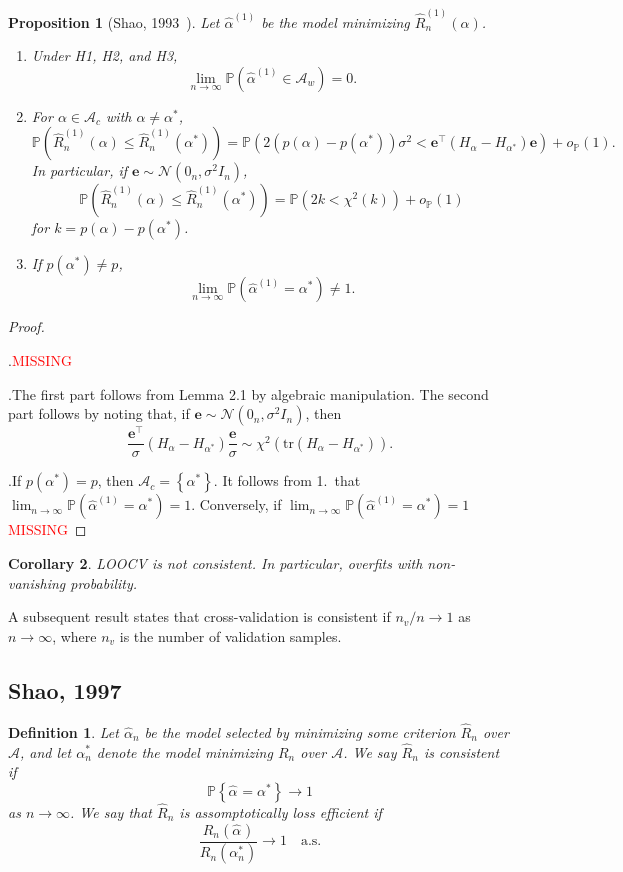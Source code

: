 \documentclass[12pt, letter paper]{article}
\newcommand{\1}{\mathmybb{1}}
\newtheorem{definition}{Definition}[section]
\newtheorem{proposition}{Proposition}[section]
\newtheorem{corollary}[proposition]{Corollary}
\newcommand{\0}{\emptyset}
\newcommand{\prob}{\mathbb{P}}
\newcommand{\paren}[1]{\left(#1 \right)}
\newcommand{\set}[1]{\left\{ #1 \right\}}
\newcommand{\Acal}{\mathcal{A}}
\newcommand{\Ncal}{\mathcal{N}}
\newcommand{\e}{\boldsymbol{e}}
\newcommand{\alphahat}[1]{\hat{\alpha}^{#1}}
\newcommand{\loocv}[1]{\hat{R}^{(1)}_{n}\paren{#1}}
\newcommand{\op}[1]{o_{\prob}\paren{#1}}
\begin{document}
\begin{proposition}[Shao, 1993~\cite{shao_1993}]
    Let \(\alphahat{(1)}\) be the model minimizing \(\loocv{\alpha}\).
    \begin{enumerate}
        \item Under H1, H2, and H3, \[\lim_{n\to\infty}\prob\paren{\alphahat{(1)}\in\Acal_{w}}=0.\]
        \item For \(\alpha\in\Acal_{c}\) with \(\alpha\neq\alpha^{*}\),\[\prob\paren{\loocv{\alpha}\leq \loocv{\alpha^{*}}} = \prob\paren{2\paren{p(\alpha) - p(\alpha^{*})}\sigma^{2} < \e^{\top}(H_{\alpha} - H_{\alpha^{*}})\e} + \op{1}.\] In particular, if \(\e\sim\Ncal(0_{n}, \sigma^{2}I_n)\), \[\prob\paren{\loocv{\alpha}\leq \loocv{\alpha^{*}}} = \prob\paren{2k < \chi^{2}(k)} + \op{1} \] for \(k=p(\alpha) - p(\alpha^{*})\).
        \item If \(p(\alpha^*) \neq p\), \[\lim_{n\to\infty}\prob\paren{\alphahat{(1)}=\alpha^{*}}\neq 1.\]
    \end{enumerate}
\end{proposition}

\begin{proof}
    \(\)

    .\quad \textcolor{red}{MISSING}

    .\quad The first part follows from Lemma 2.1 by algebraic manipulation. The second part follows by noting that, if \(\e\sim\Ncal(0_{n}, \sigma^{2}I_{n})\), then \[\frac{\e^{\top}}{\sigma}\paren{H_{\alpha} - H_{\alpha^{*}}}\frac{\e}{\sigma}\sim\chi^{2}\paren{\mathrm{tr}\paren{H_{\alpha}-H_{\alpha^{*}}}}.\]

    .\quad If \(p(\alpha^{*}) = p\), then \(\Acal_{c} = \set{\alpha^{*}}\). It follows from 1.\ that \(\lim_{n\to\infty}\prob\paren{\alphahat{(1)}=\alpha^{*} }= 1\).
    Conversely, if \(\lim_{n\to\infty}\prob\paren{\alphahat{(1)}=\alpha^{*}} = 1\) \textcolor{red}{MISSING}
\end{proof}

\begin{corollary}
    LOOCV is not consistent. In particular, overfits with non-vanishing probability.
\end{corollary}

A subsequent result states that cross-validation is consistent if \(n_{v}/n\to 1\) as \(n\to\infty\), where \(n_{v}\) is the number of validation samples.

\subsection{Shao, 1997}
\begin{definition}
    Let \(\alphahat{}_{n}\) be the model selected by minimizing some criterion \(\hat{R}_{n}\) over \(\Acal\), and let \(\alpha^{*}_{n}\) denote the model minimizing \(R_{n}\) over \(\Acal\). We say \(\hat{R}_{n}\) is \emph{consistent} if 
    \[\prob\set{\alphahat{} = \alpha^{*}}\to 1\]
    as \(n\to\infty\). We say that \(\hat{R}_{n}\) is \emph{assomptotically loss efficient} if 
    \[\frac{R_{n}(\alphahat{})}{R_{n}(\alpha^{*}_{n})}\to 1\quad\text{a.s.}\]
\end{definition}
\end{document}
